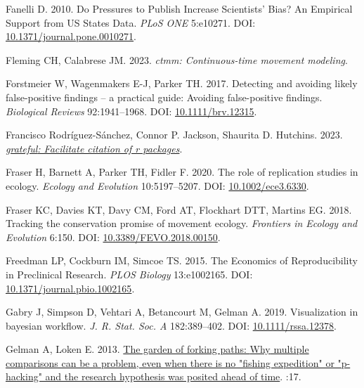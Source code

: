 \documentclass[10pt,a4paper]{article}
\newlength{\cslhangindent}
\newlength{\cslentryspacingunit} %
\newenvironment{CSLReferences}[2] %
 {%
  \setlength{\parindent}{0pt}
  \ifodd #1
  \let\oldpar\par
  \def\par{\hangindent=\cslhangindent\oldpar}
  \fi
  \setlength{\parskip}{#2\cslentryspacingunit}
 }%
 {}
\begin{document}
\begin{CSLReferences}{1}{0}
\leavevmode{}%
Fanelli D. 2010. Do {Pressures} to {Publish} {Increase} {Scientists}' {Bias}? {An} {Empirical} {Support} from {US} {States} {Data}. \emph{PLoS ONE} 5:e10271. DOI: \href{https://doi.org/10.1371/journal.pone.0010271}{10.1371/journal.pone.0010271}.

\leavevmode{}%
Fleming CH, Calabrese JM. 2023. \emph{{ctmm}: Continuous-time movement modeling}.

\leavevmode{}%
Forstmeier W, Wagenmakers E-J, Parker TH. 2017. Detecting and avoiding likely false-positive findings -- a practical guide: {Avoiding} false-positive findings. \emph{Biological Reviews} 92:1941--1968. DOI: \href{https://doi.org/10.1111/brv.12315}{10.1111/brv.12315}.

\leavevmode{}%
Francisco Rodríguez-Sánchez, Connor P. Jackson, Shaurita D. Hutchins. 2023. \emph{\href{https://github.com/Pakillo/grateful}{{grateful}: Facilitate citation of r packages}}.

\leavevmode{}%
Fraser H, Barnett A, Parker TH, Fidler F. 2020. The role of replication studies in ecology. \emph{Ecology and Evolution} 10:5197--5207. DOI: \href{https://doi.org/10.1002/ece3.6330}{10.1002/ece3.6330}.

\leavevmode{}%
Fraser KC, Davies KT, Davy CM, Ford AT, Flockhart DTT, Martins EG. 2018. Tracking the conservation promise of movement ecology. \emph{Frontiers in Ecology and Evolution} 6:150. DOI: \href{https://doi.org/10.3389/FEVO.2018.00150}{10.3389/FEVO.2018.00150}.

\leavevmode{}%
Freedman LP, Cockburn IM, Simcoe TS. 2015. The {Economics} of {Reproducibility} in {Preclinical} {Research}. \emph{PLOS Biology} 13:e1002165. DOI: \href{https://doi.org/10.1371/journal.pbio.1002165}{10.1371/journal.pbio.1002165}.

\leavevmode{}%
Gabry J, Simpson D, Vehtari A, Betancourt M, Gelman A. 2019. Visualization in bayesian workflow. \emph{J. R. Stat. Soc. A} 182:389--402. DOI: \href{https://doi.org/10.1111/rssa.12378}{10.1111/rssa.12378}.

\leavevmode{}%
Gelman A, Loken E. 2013. \href{http://www.stat.columbia.edu/~gelman/research/unpublished/p_hacking.pdf}{The garden of forking paths: {Why} multiple comparisons can be a problem, even when there is no "fishing expedition" or "p-hacking" and the research hypothesis was posited ahead of time}. :17.


\end{CSLReferences}
\end{document}

